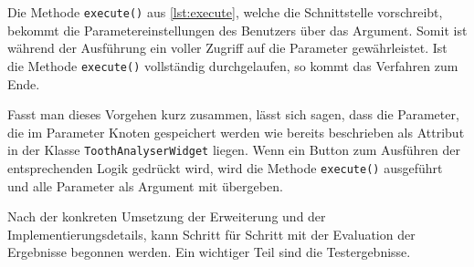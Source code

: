 Die Methode \texttt{execute()} aus \ref{lst:execute}, welche die Schnittstelle
vorschreibt, bekommt die Parametereinstellungen des Benutzers über das Argument.
Somit ist während der Ausführung ein voller Zugriff auf die Parameter
gewährleistet. Ist die Methode \texttt{execute()} vollständig durchgelaufen, so kommt
das Verfahren zum Ende.

Fasst man dieses Vorgehen kurz zusammen, lässt sich sagen, dass die Parameter,
die im Parameter Knoten gespeichert werden wie bereits beschrieben als Attribut
in der Klasse \texttt{ToothAnalyserWidget} liegen. Wenn ein Button zum Ausführen
der entsprechenden Logik gedrückt wird, wird die Methode \texttt{execute()}
ausgeführt und alle Parameter als Argument mit übergeben.

Nach der konkreten Umsetzung der Erweiterung und der Implementierungsdetails, kann
Schritt für Schritt mit der Evaluation der Ergebnisse begonnen werden. Ein
wichtiger Teil sind die Testergebnisse.
